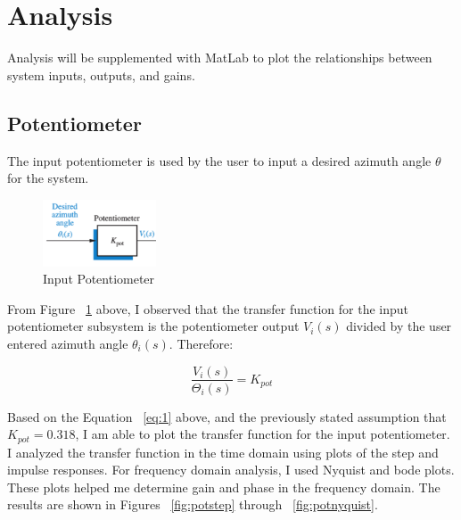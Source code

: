 \documentclass[12pt]{article}
\begin{document}
\section{Analysis}

Analysis will be supplemented with MatLab to plot the relationships between system inputs, outputs, and gains.

\subsection{Potentiometer}

The input potentiometer is used by the user to input a desired azimuth angle $\theta$ for the system.

\begin{figure}[H]
\begin{center}
	\includegraphics[width=0.3\textwidth]{./img/PotentiometerBlock.png}
	\caption{\label{fig:pot}Input Potentiometer}
\end{center}
\end{figure}

From Figure ~\ref{fig:pot} above, I observed that the transfer function for the input potentiometer subsystem is the potentiometer output $V_{i}(s)$ divided by the user entered azimuth angle $\theta_{i}(s)$. Therefore:

\begin{equation}
\frac{V_{i}(s)}{\Theta_i(s)} = K_{pot}\label{eq:1}
\end{equation}

Based on the Equation ~\ref{eq:1} above, and the previously stated assumption that $K_{pot} = 0.318$, I am able to plot the transfer function for the input potentiometer. I analyzed the transfer function in the time domain using plots of the step and impulse responses. For frequency domain analysis, I used Nyquist and bode plots. These plots helped me determine gain and phase in the frequency domain. The results are shown in Figures ~\ref{fig:potstep} through ~\ref{fig:potnyquist}.
\end{document}
